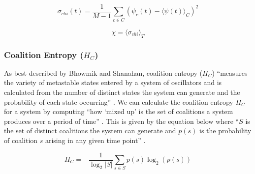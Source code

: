 \documentclass[a4paper,11pt]{article}
\begin{document}
\begin{equation} \label{eq:var-sync}
\sigma_{chi}(t) = \frac{1}{M - 1}\sum_{c \in C}(\psi_c(t) - \langle \psi(t) \rangle_C)^2
\end{equation}

\begin{equation} \label{eq:chi}
\chi = \langle \sigma_{chi} \rangle_T
\end{equation}

\subsubsection{Coalition Entropy ($H_C$)} \label{sec:bg:hc}

As best described by Bhowmik and Shanahan, coalition entropy ($H_C$) ``measures the variety of metastable states entered by a system of oscillators and is calculated from the number of distinct states the system can generate and the probability of each state occurring'' \cite{Bhowmik2013}. We can calculate the coalition entropy $H_C$ for a system by computing ``how `mixed up' is the set of coalitions a system produces over a period of time'' \cite{Shanahan2010}. This is given by the equation below where ``$S$ is the set of distinct coalitions the system can generate and $p(s)$ is the probability of coalition $s$ arising in any given time point'' \cite{Shanahan2010}.

\begin{equation} \label{eq:hc}
H_C = - \frac{1}{\log_2 |S|}\sum_{s \in S}p(s) \log_2 (p(s))
\end{equation}

%
\end{document}
